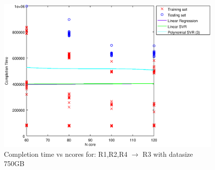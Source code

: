 
\begin {figure}[hbtp]
\centering
\includegraphics[width=\textwidth]{output/R1,R2,R4_R3_750_ALL_FEATURES/plot_R1,R2,R4_R3_750_bestmodels.eps}
\caption{Completion time vs ncores for: R1,R2,R4 $\rightarrow$ R3 with datasize 750GB}
\label{fig:coreonly_linear_R1,R2,R4_R3_750}
\end {figure}
